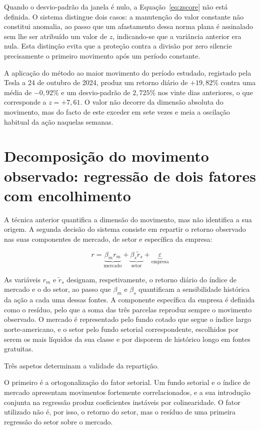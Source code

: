 Quando o desvio-padrão da janela é nulo, a Equação~\ref{eq:zscore} não está definida. O sistema
distingue dois casos: a manutenção do valor constante não constitui anomalia, ao passo que um
afastamento dessa norma plana é assinalado sem lhe ser atribuído um valor de $z$, indicando-se que
a variância anterior era nula. Esta distinção evita que a proteção contra a divisão por zero
silencie precisamente o primeiro movimento após um período constante.

A aplicação do método ao maior movimento do período estudado, registado pela Tesla a 24 de outubro
de 2024, produz um retorno diário de $+19{,}82\%$ contra uma média de $-0{,}92\%$ e um
desvio-padrão de $2{,}725\%$ nos vinte dias anteriores, o que corresponde a $z = +7{,}61$. O valor
não decorre da dimensão absoluta do movimento, mas do facto de este exceder em sete vezes e meia a
oscilação habitual da ação naquelas semanas.


\section{Decomposição do movimento observado: regressão de dois fatores com encolhimento}
\label{sec:met_decomposicao}

A técnica anterior quantifica a dimensão do movimento, mas não identifica a sua origem. A segunda
decisão do sistema consiste em repartir o retorno observado nas suas componentes de mercado, de
setor e específica da empresa:

\begin{equation}
r = \underbrace{\beta_m r_m}_{\text{mercado}} + \underbrace{\beta_s \tilde{r}_s}_{\text{setor}} + \underbrace{\varepsilon}_{\text{empresa}}
\label{eq:decomposicao}
\end{equation}

As variáveis $r_m$ e $\tilde{r}_s$ designam, respetivamente, o retorno diário do índice de mercado
e o do setor, ao passo que $\beta_m$ e $\beta_s$ quantificam a sensibilidade histórica da ação a
cada uma dessas fontes. A componente específica da empresa é
definida como o resíduo, pelo que a soma das três parcelas reproduz sempre o movimento observado.
O mercado é representado pelo fundo cotado que segue o índice largo norte-americano, e o setor
pelo fundo setorial correspondente, escolhidos por serem os mais líquidos da sua classe e por
disporem de histórico longo em fontes gratuitas.

Três aspetos determinam a validade da repartição.

O primeiro é a ortogonalização do fator setorial. Um fundo setorial e o índice de mercado
apresentam movimentos fortemente correlacionados, e a sua introdução conjunta na regressão produz
coeficientes instáveis por colinearidade. O fator utilizado não é, por isso, o retorno do setor,
mas o resíduo de uma primeira regressão do setor sobre o mercado.


